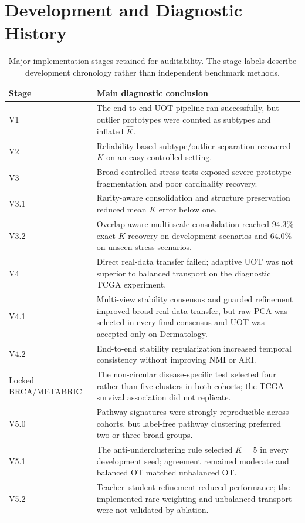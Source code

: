 \section{Development and Diagnostic History}\label{app:history}
\begin{table}[h]
\centering
\caption{Major implementation stages retained for auditability. The stage labels describe development chronology rather than independent benchmark methods.}
\small
\begin{tabularx}{\textwidth}{lX}
\toprule
Stage & Main diagnostic conclusion \\
\midrule
V1 & The end-to-end UOT pipeline ran successfully, but outlier prototypes were counted as subtypes and inflated $\widehat K$. \\
V2 & Reliability-based subtype/outlier separation recovered $K$ on an easy controlled setting. \\
V3 & Broad controlled stress tests exposed severe prototype fragmentation and poor cardinality recovery. \\
V3.1 & Rarity-aware consolidation and structure preservation reduced mean $K$ error below one. \\
V3.2 & Overlap-aware multi-scale consolidation reached 94.3\% exact-$K$ recovery on development scenarios and 64.0\% on unseen stress scenarios. \\
V4 & Direct real-data transfer failed; adaptive UOT was not superior to balanced transport on the diagnostic TCGA experiment. \\
V4.1 & Multi-view stability consensus and guarded refinement improved broad real-data transfer, but raw PCA was selected in every final consensus and UOT was accepted only on Dermatology. \\
V4.2 & End-to-end stability regularization increased temporal consistency without improving NMI or ARI. \\
Locked BRCA/METABRIC & The non-circular disease-specific test selected four rather than five clusters in both cohorts; the TCGA survival association did not replicate. \\
V5.0 & Pathway signatures were strongly reproducible across cohorts, but label-free pathway clustering preferred two or three broad groups. \\
V5.1 & The anti-underclustering rule selected $K=5$ in every development seed; agreement remained moderate and balanced OT matched unbalanced OT. \\
V5.2 & Teacher--student refinement reduced performance; the implemented rare weighting and unbalanced transport were not validated by ablation. \\

\end{tabularx}
\end{table}
